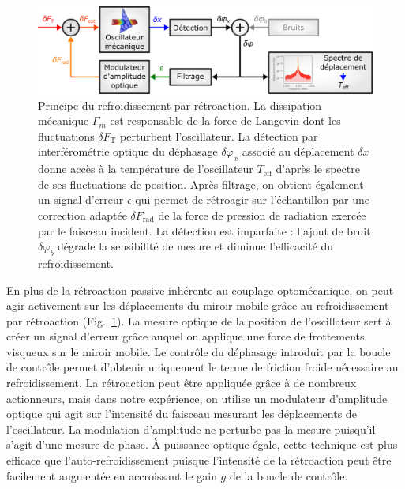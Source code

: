 \documentclass[12pt,a4paper]{article}
\begin{document}
\begin{figure}
\center
\includegraphics[scale=0.6]{figures/feedback_cooling_v2.png}
\caption{Principe du refroidissement par rétroaction.
La dissipation mécanique $\Gamma_m$ est responsable de la force de Langevin dont les fluctuations $\delta F_\mathrm{T}$ perturbent l'oscillateur.
La détection par interférométrie optique du déphasage $\delta \varphi_x$ associé au déplacement $\delta x$ donne accès à la température de l'oscillateur $T_\mathrm{eff}$ d'après le spectre de ses fluctuations de position.
Après filtrage, on obtient également un signal d'erreur $\epsilon$ qui permet de rétroagir sur l'échantillon par une correction adaptée $\delta F_\mathrm{rad}$ de la force de pression de radiation exercée par le faisceau incident.
La détection est imparfaite : l'ajout de bruit $\delta \varphi_b$ dégrade la sensibilité de mesure et diminue l'efficacité du refroidissement.}
\label{fig:feedback_scheme}
\end{figure}

En plus de la rétroaction passive inhérente au couplage optomécanique, on peut agir activement sur les déplacements du miroir mobile grâce au refroidissement par rétroaction (Fig.~\ref{fig:feedback_scheme}).
La mesure optique de la position de l'oscillateur sert à créer un signal d'erreur grâce auquel on applique une force de frottements visqueux sur le miroir mobile.
Le contrôle du déphasage introduit par la boucle de contrôle permet d'obtenir uniquement le terme de friction froide nécessaire au refroidissement.
La rétroaction peut être appliquée grâce à de nombreux actionneurs, mais dans notre expérience, on utilise un modulateur d'amplitude optique qui agit sur l'intensité du faisceau mesurant les déplacements de l'oscillateur.
La modulation d'amplitude ne perturbe pas la mesure puisqu'il s'agit d'une mesure de phase. 
À puissance optique égale, cette technique est plus efficace que l'auto-refroidissement puisque l'intensité de la rétroaction peut être facilement augmentée en accroissant le gain $g$ de la boucle de contrôle.
\end{document}

